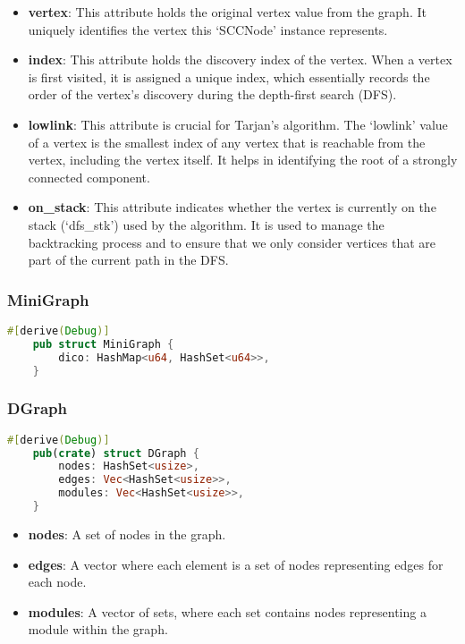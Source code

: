 \begin{itemize}
    \item \textbf{vertex}: This attribute holds the original vertex value from the graph.
    It uniquely identifies the vertex this `SCCNode' instance represents.
    \item \textbf{index}: This attribute holds the discovery index of the vertex.
    When a vertex is first visited, it is assigned a unique index, which essentially records the order of the vertex's discovery during the depth-first search (DFS).
    \item \textbf{lowlink}: This attribute is crucial for Tarjan's algorithm.
    The `lowlink' value of a vertex is the smallest index of any vertex that is reachable from the vertex, including the vertex itself.
    It helps in identifying the root of a strongly connected component.
    \item \textbf{on\_stack}: This attribute indicates whether the vertex is currently on the stack (`dfs\_stk') used by the algorithm.
    It is used to manage the backtracking process and to ensure that we only consider vertices that are part of the current path in the DFS\@.
\end{itemize}


\subsubsection{MiniGraph}

\begin{lstlisting}[language=Rust, style=rust, caption={Defining the Minigraph}, label={lst:rust-define-minigraph}, firstnumber=1]
    #[derive(Debug)]
    pub struct MiniGraph {
        dico: HashMap<u64, HashSet<u64>>,
    }
\end{lstlisting}

\subsubsection{DGraph}

\begin{lstlisting}[language=Rust, style=rust, caption={Defining the DGraph}, label={lst:rust-define-dgraph}, firstnumber=1]
    #[derive(Debug)]
    pub(crate) struct DGraph {
        nodes: HashSet<usize>,
        edges: Vec<HashSet<usize>>,
        modules: Vec<HashSet<usize>>,
    }
\end{lstlisting}

\begin{itemize}
    \item \textbf{nodes}: A set of nodes in the graph.
    \item \textbf{edges}: A vector where each element is a set of nodes representing edges for each node.
    \item \textbf{modules}: A vector of sets, where each set contains nodes representing a module within the graph.
\end{itemize}

